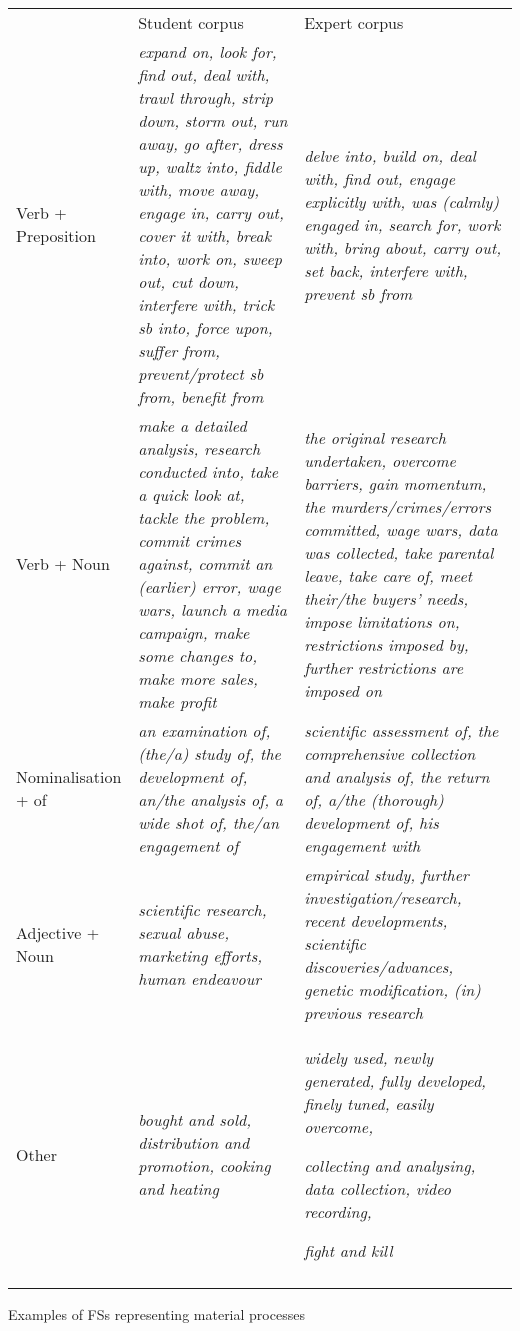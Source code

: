 \begin{tabularx}{\textwidth}{XXX} & Student corpus & Expert corpus\\

\lsptoprule
Verb + Preposition & \textit{expand on, look for, find out, deal with, trawl through, strip down, storm out, run away, go after, dress up, waltz into, fiddle with, move away, engage in, carry out, cover it with, break into, work on, sweep out, cut down, interfere with, trick sb into, force upon, suffer from, prevent/protect sb from, benefit from} & \textit{delve into, build on, deal with, find out, engage explicitly with, was (calmly) engaged in, search for, work with, bring about, carry out, set back, interfere with, prevent sb from}\\
Verb + Noun & \textit{make a detailed analysis, research conducted into, take a quick look at, tackle the problem, commit crimes against, commit an (earlier) error, wage wars, launch a media campaign, make some changes to, make more sales, make profit} & \textit{the original research undertaken, overcome barriers, gain momentum, the murders/crimes/errors committed, wage wars, data was collected, take parental leave, take care of, meet their/the buyers’ needs, impose limitations on, restrictions imposed by, further restrictions are imposed on}\\
Nominalisation + of & \textit{an examination of, (the/a) study of, the development of, an/the analysis of, a wide shot of, the/an engagement of} & \textit{scientific assessment of, the comprehensive collection and analysis of, the return of, a/the (thorough) development of, his engagement with}\\
Adjective + Noun & \textit{scientific research, sexual abuse, marketing efforts, human endeavour} & \textit{empirical study, further investigation/research, recent developments, scientific discoveries/advances, genetic modification, (in) previous research}\\
Other & \textit{bought and sold, distribution and promotion, cooking and heating} & \textit{widely used, newly generated, fully developed, finely tuned, easily overcome,}

\textit{collecting and analysing, data collection, video recording,} 

\textit{fight and kill}\\
\lspbottomrule
\end{tabularx}
\begin{table}
\caption{Examples of FSs representing material processes}
\label{tab:key:5}
\end{table}

